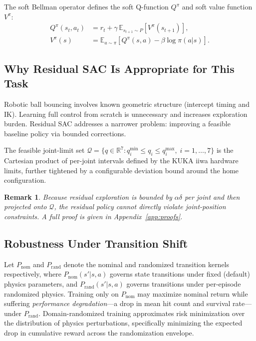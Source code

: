 \documentclass[10pt,twocolumn,letterpaper]{article}
\newtheorem{remark}{Remark}
\begin{document}
The soft Bellman operator defines the soft Q-function $Q^\pi$ and soft value function $V^\pi$:
\begin{align*}
Q^\pi(s_t,a_t) &= r_t+\gamma\,\mathbb{E}_{s_{t+1} \sim P}\!\left[V^\pi(s_{t+1})\right], \\
V^\pi(s) &= \mathbb{E}_{a\sim\pi}\!\left[Q^\pi(s,a)-\beta\log\pi(a|s)\right].
\end{align*}

\subsection{Why Residual SAC Is Appropriate for This Task}
Robotic ball bouncing involves known geometric structure (intercept timing and IK). Learning full control from scratch is unnecessary and increases exploration burden. Residual SAC addresses a narrower problem: improving a feasible baseline policy via bounded corrections.

The feasible joint-limit set $\mathcal{Q} = \{q \in \mathbb{R}^7 : q^{\min}_i \le q_i \le q^{\max}_i, \; i=1,\ldots,7\}$ is the Cartesian product of per-joint intervals defined by the KUKA iiwa hardware limits, further tightened by a configurable deviation bound around the home configuration.

\begin{remark}
Because residual exploration is bounded by $\alpha\delta$ per joint and then projected onto $\mathcal{Q}$, the residual policy cannot directly violate joint-position constraints. A full proof is given in Appendix~\ref{app:proofs}.
\end{remark}

\subsection{Robustness Under Transition Shift}
Let $P_{\mathrm{nom}}$ and $P_{\mathrm{rand}}$ denote the nominal and randomized transition kernels respectively, where $P_{\mathrm{nom}}(s'|s,a)$ governs state transitions under fixed (default) physics parameters, and $P_{\mathrm{rand}}(s'|s,a)$ governs transitions under per-episode randomized physics. Training only on $P_{\mathrm{nom}}$ may maximize nominal return while suffering \emph{performance degradation}---a drop in mean hit count and survival rate---under $P_{\mathrm{rand}}$. Domain-randomized training approximates risk minimization over the distribution of physics perturbations, specifically minimizing the expected drop in cumulative reward across the randomization envelope.
\end{document}
